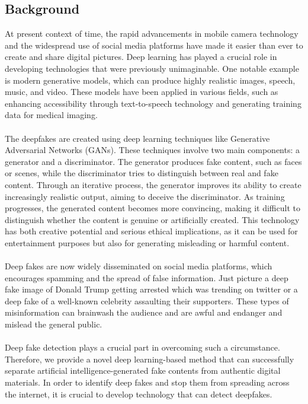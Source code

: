 \subsection{Background}
At present context of time, the rapid advancements in mobile camera technology and the widespread use of social media platforms have made it easier than ever to create and share digital pictures. Deep learning has played a crucial role in developing technologies that were previously unimaginable. One notable example is modern generative models, which can produce highly realistic images, speech, music, and video. These models have been applied in various fields, such as enhancing accessibility through text-to-speech technology and generating training data for medical imaging.
\\
\\
The deepfakes are created using deep learning techniques like Generative Adversarial Networks (GANs). These techniques involve two main components: a generator and a discriminator. The generator produces fake content, such as faces or scenes, while the discriminator tries to distinguish between real and fake content. Through an iterative process, the generator improves its ability to create increasingly realistic output, aiming to deceive the discriminator. As training progresses, the generated content becomes more convincing, making it difficult to distinguish whether the content is genuine or artificially created. This technology has both creative potential and serious ethical implications, as it can be used for entertainment purposes but also for generating misleading or harmful content.
\\\\
Deep fakes are now widely disseminated on social media platforms, which encourages spamming and the spread of false information. Just picture a deep fake image of Donald Trump getting arrested which was trending on twitter or a deep fake of a well-known celebrity assaulting their supporters.
These types of misinformation can brainwash the audience and are awful and endanger and mislead the general public.
\\
\\
Deep fake detection plays a crucial part in overcoming such a circumstance. Therefore, we provide a novel deep learning-based method that can successfully separate artificial intelligence-generated fake contents from authentic digital materials. In order to identify deep fakes and stop them from spreading across the internet, it is crucial to develop technology that can detect deepfakes.